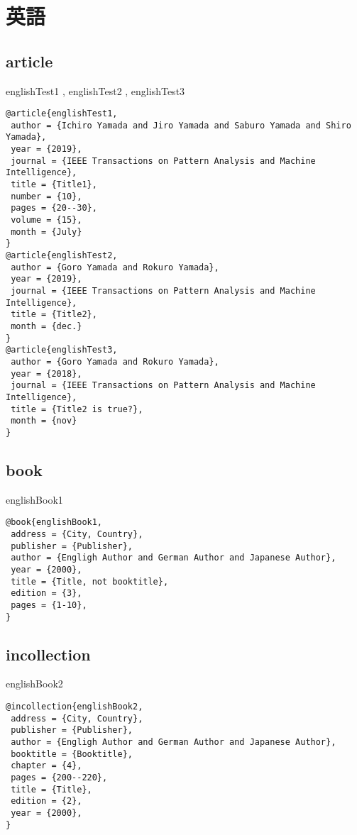 \documentclass[10pt,a4paper]{article}
\begin{document}
\section{英語}
\subsection{article}

englishTest1 \cite{englishTest1},
englishTest2 \cite{englishTest2},
englishTest3 \cite{englishTest3}

\begin{lstlisting}
@article{englishTest1,
 author = {Ichiro Yamada and Jiro Yamada and Saburo Yamada and Shiro Yamada},
 year = {2019},
 journal = {IEEE Transactions on Pattern Analysis and Machine Intelligence},
 title = {Title1},
 number = {10},
 pages = {20--30},
 volume = {15},
 month = {July}
}
@article{englishTest2,
 author = {Goro Yamada and Rokuro Yamada},
 year = {2019},
 journal = {IEEE Transactions on Pattern Analysis and Machine Intelligence},
 title = {Title2},
 month = {dec.}
}
@article{englishTest3,
 author = {Goro Yamada and Rokuro Yamada},
 year = {2018},
 journal = {IEEE Transactions on Pattern Analysis and Machine Intelligence},
 title = {Title2 is true?},
 month = {nov}
}
\end{lstlisting}

\subsection{book}
englishBook1 \cite{englishBook1}

\begin{lstlisting}
@book{englishBook1,
 address = {City, Country},
 publisher = {Publisher},
 author = {Engligh Author and German Author and Japanese Author},
 year = {2000},
 title = {Title, not booktitle},
 edition = {3},
 pages = {1-10},
}
\end{lstlisting}

\subsection{incollection}
englishBook2 \cite{englishBook2}

\begin{lstlisting}
@incollection{englishBook2,
 address = {City, Country},
 publisher = {Publisher},
 author = {Engligh Author and German Author and Japanese Author},
 booktitle = {Booktitle},
 chapter = {4},
 pages = {200--220},
 title = {Title},
 edition = {2},
 year = {2000},
}
\end{lstlisting}
\end{document}
